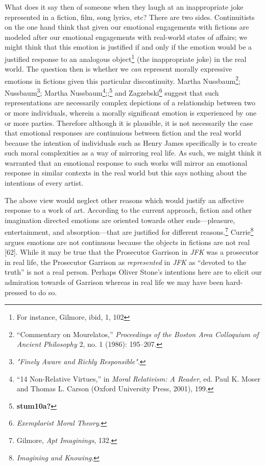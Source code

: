 \documentclass[phdthesis,12pt,final]{wuthesis}
\theoremstyle{definition}
\theoremstyle{definition}
\theoremstyle{definition}
\theoremstyle{definition}
\theoremstyle{remark}
\begin{document}
What does it say then of someone when they laugh at an inappropriate joke represented in a fiction, film, song lyrics, etc? There are two sides. Continuitists on the one hand think that given our emotional engagements with fictions are modeled after our emotional engagements with real-world states of affairs; we might think that this emotion is justified if and only if the emotion would be a justified response to an analogous object\footnote{For instance, Gilmore, ibid, 1, 102} (the inappropriate joke) in the real world. The question then is whether we \emph{can} represent morally expressive emotions in fictions given this particular discontinuity. Martha Nussbaum\footnote{{``Commentary on {Mourelatos},''} \emph{Proceedings of the Boston Area Colloquium of Ancient Philosophy} 2, no. 1 (1986): 195--207.}; Nussbaum\footnote{\emph{"{Finely Aware} and {Richly Responsible}"}.}; Martha Nussbaum\footnote{{``14 {Non-Relative Virtues},''} in \emph{Moral {Relativism}: {A Reader}}, ed. Paul K. Moser and Thomas L. Carson (Oxford University Press, 2001), 199.};;\footnote{\textbf{stum10a?}} and Zagzebski\footnote{\emph{Exemplarist {Moral Theory}}.} suggest that such representations are necessarily complex depictions of a relationship between two or more individuals, wherein a morally significant emotion is experienced by one or more parties. Therefore although it is plausible, it is not necessarily the case that emotional responses are continuious between fiction and the real world because the intention of individuals such as Henry James specifically is to create such moral complexities as a way of mirroring real life. As such, we might think it warranted that an emotional response to such works will mirror an emotional response in similar contexts in the real world but this says nothing about the intentions of every artist.

The above view would neglect other reasons which would justify an affective response to a work of art. According to the current approach, fiction and other imagination directed emotions are oriented towards other ends---pleasure, entertainment, and absorption---that are justified for different reasons.\footnote{Gilmore, \emph{Apt {Imaginings}}, 132.} Currie\footnote{\emph{Imagining and Knowing}.} argues emotions are not continuous because the objects in fictions are not real {[}62{]}. While it may be true that the Prosecutor Garrison in \emph{JFK} was a prosecutor in real life, the Prosecutor Garrison as \emph{represented} in \emph{JFK} as ``devoted to the truth'' is not a real person. Perhaps Oliver Stone's intentions here are to elicit our admiration towards of Garrison whereas in real life we may have been hard-pressed to do so.
\end{document}
